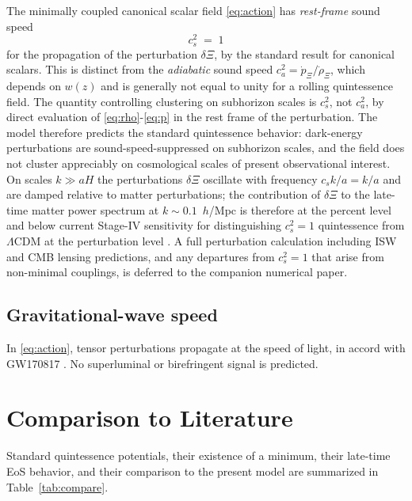 \documentclass[11pt,reqno]{amsart}
\theoremstyle{plain}
\theoremstyle{definition}
\theoremstyle{remark}
\begin{document}
The minimally coupled canonical scalar field \eqref{eq:action} has
\emph{rest-frame} sound speed
\[
  c_{s}^{2} \;=\; 1
\]
for the propagation of the perturbation $\delta\Xi$, by the standard
result for canonical scalars. This is
distinct from the \emph{adiabatic} sound speed
$c_{a}^{2} = \dot p_\Xi/\dot\rho_\Xi$, which depends on $w(z)$ and is
generally not equal to unity for a rolling quintessence field. The
quantity controlling clustering on subhorizon scales is $c_{s}^{2}$,
not $c_{a}^{2}$, by direct evaluation of \eqref{eq:rho}-\eqref{eq:p}
in the rest frame of the perturbation.
The model therefore predicts the standard quintessence behavior: dark-energy
perturbations are sound-speed-suppressed on subhorizon scales, and the
field does not cluster appreciably on cosmological scales of present
observational interest. On scales $k \gg a H$ the perturbations $\delta\Xi$
oscillate with frequency $c_s k/a = k/a$ and are damped relative to matter
perturbations; the contribution of $\delta\Xi$ to the late-time matter
power spectrum at $k \sim 0.1$~$h$/Mpc is therefore at the percent level
and below current Stage-IV sensitivity for distinguishing $c_s^{2} = 1$
quintessence from $\Lambda$CDM at the perturbation level
\cite{ShajibFrieman2025,Turyshev2026Review}. A full perturbation
calculation including ISW and CMB lensing predictions, and any departures
from $c_s^{2} = 1$ that arise from non-minimal couplings, is deferred to
the companion numerical paper.

\subsection{Gravitational-wave speed}

In \eqref{eq:action}, tensor perturbations propagate at the speed of
light, in accord with GW170817 \cite{GW170817}. No superluminal or
birefringent signal is predicted.

\section{Comparison to Literature}\label{sec:comparison}

Standard quintessence potentials, their existence of a minimum, their
late-time EoS behavior, and their comparison to the present model are
summarized in Table~\ref{tab:compare}.
\end{document}
